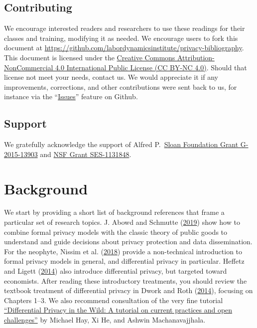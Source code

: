 \documentclass[]{article}
\begin{document}
\subsection{Contributing}\label{contributing}

We encourage interested readers and researchers to use these readings
for their classes and training, modifying it as needed. We encourage
users to fork this document at
\url{https://github.com/labordynamicsinstitute/privacy-bibliography}.
This document is licensed under the
\href{https://creativecommons.org/licenses/by-nc/4.0/}{Creative Commons
Attribution-NonCommercial 4.0 International Public License (CC BY-NC
4.0)}. Should that license not meet your needs, contact us. We would
appreciate it if any improvements, corrections, and other contributions
were sent back to us, for instance via the
``\href{https://github.com/labordynamicsinstitute/privacy-bibliography/issues}{Issues}''
feature on Github.

\subsection{Support}\label{support}

We gratefully acknowledge the support of Alfred
P.~\href{https://sloan.org/grant-detail/6845}{Sloan Foundation Grant
G-2015-13903} and
\href{http://www.nsf.gov/awardsearch/showAward.do?AwardNumber=1131848}{NSF
Grant SES-1131848}.

\section{Background}\label{background}

We start by providing a short list of background references that frame a
particular set of research topics. J. Abowd and Schmutte
(\protect\hyperlink{ref-AbowdSchmutte:Privacy:AER}{2019}) show how to
combine formal privacy models with the classic theory of public goods to
understand and guide decisions about privacy protection and data
dissemination. For the neophyte, Nissim et al.
(\protect\hyperlink{ref-Nissim:DPNonTech:WP:2018}{2018}) provide a
non-technical introduction to formal privacy models in general, and
differential privacy in particular. Heffetz and Ligett
(\protect\hyperlink{ref-Heffetz2014}{2014}) also introduce differential
privacy, but targeted toward economists. After reading these
introductory treatments, you should review the textbook treatment of
differential privacy in Dwork and Roth
(\protect\hyperlink{ref-Dwork:Roth:journal:version:2014}{2014}),
focusing on Chapters 1--3. We also recommend consultation of the very
fine tutorial
\href{https://users.cs.duke.edu/~ashwin/index.html\#tutorials}{``Differential
Privacy in the Wild: A tutorial on current practices and open
challenges''} by Michael Hay, Xi He, and Ashwin Machanavajjhala.
\end{document}
